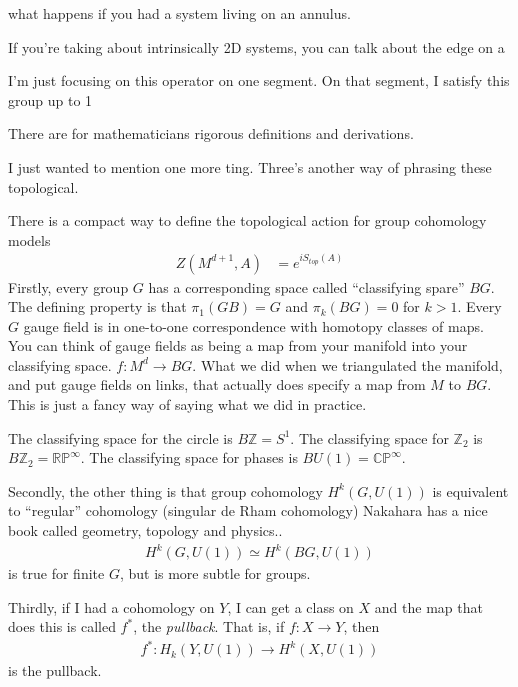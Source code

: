 \begin{question}
    what happens if you had a system living on an annulus.
\end{question}
If you're taking about intrinsically 2D systems,
you can talk about the edge on a 

I'm just focusing on this operator on one segment.
On that segment,
I satisfy this group up to 1 

There are for mathematicians rigorous definitions and derivations.

I just wanted to mention one more ting.
Three's another way of phrasing these topological.

There is a compact way to define the topological action for group cohomology
models
\begin{align}
    Z\left( M^{d+1}, A \right) &=
    e^{iS_{top}(A)}
\end{align}
Firstly, every group $G$ has a corresponding space called ``classifying
spare'' $BG$.
The defining property is that
$\pi_1(GB) = G$
and
$\pi_k(BG)=0$
for $k>1$.
Every $G$ gauge field is in one-to-one correspondence with
homotopy classes of maps.
You can think of gauge fields as being a map from your manifold into your
classifying space.
$f: M^d \to BG$.
What we did when we triangulated the manifold,
and put gauge fields on links,
that actually does specify a map from $M$ to $BG$.
This is just a fancy way of saying what we did in practice.

The classifying space for the circle is
$B\mathbb{Z} = S^1$.
The classifying space for $\mathbb{Z}_2$ is
$B\mathbb{Z}_2 = \mathbb{RP}^{\infty}$.
The classifying space for phases is
$BU(1) = \mathbb{CP}^{\infty}$.

Secondly, the other thing is that group cohomology
$H^k(G, U(1))$
is equivalent to
``regular'' cohomology (singular de Rham cohomology)
Nakahara has a nice book called geometry, topology and physics..
\begin{align}
    H^k(G, U(1)) \simeq 
    H^k(BG, U(1))
\end{align}
is true for finite $G$,
but is more subtle for groups.


Thirdly,
if I had a cohomology on $Y$,
I can get a class on $X$ and the map that does this is called
$f^*$, the \emph{pullback}.
That is,
if $f:X \to Y$,
then
\begin{align}
    f^*: H_k(Y, U(1)) \to H^k(X, U(1))
\end{align}
is the pullback.

